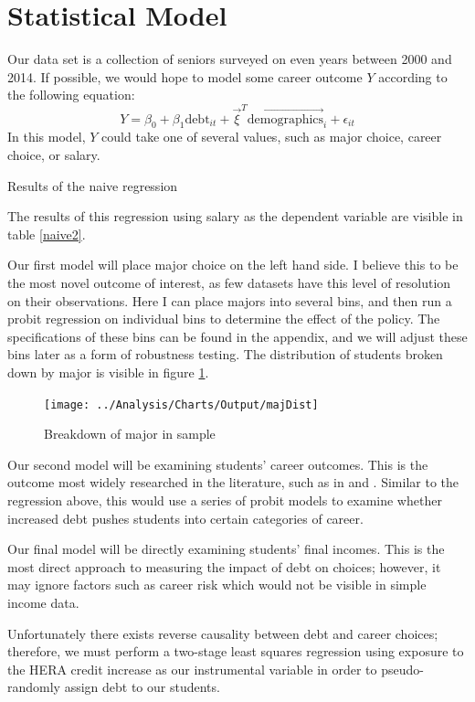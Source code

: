 \documentclass{article}
\newcommand{\regs}{../Analysis/Regressions/Output/}
\begin{document}
	\section{Statistical Model}
	
	Our data set is a collection of seniors surveyed on even years between 2000 and 2014. If possible, we would hope to model some career outcome $Y$ according to the following equation: $$Y = \beta_0 + \beta_1 \mbox{debt}_{it} + \vec{\xi}^T \vec{\mbox{demographics}}_i + \epsilon_{it}$$ In this model, $Y$ could take one of several values, such as major choice, career choice, or salary. 
	
	\begin{table}
		\centering
		\caption{Results of the naive regression}
		
		\label{naive2}
	\end{table}
	
	The results of this regression using salary as the dependent variable are visible in table \ref{naive2}. 
	
	Our first model will place major choice on the left hand side. I believe this to be the most novel outcome of interest, as few datasets have this level of resolution on their observations. Here I can place majors into several bins, and then run a probit regression on individual bins to determine the effect of the policy. The specifications of these bins can be found in the appendix, and we will adjust these bins later as a form of robustness testing. The distribution of students broken down by major is visible in figure \ref{majDist}.

	\begin{figure}
		\centering
		\caption{Breakdown of major in sample}
		\texttt{[image: ../Analysis/Charts/Output/majDist]}
		\label{majDist}
	\end{figure}
	
	Our second model will be examining students' career outcomes. This is the outcome most widely researched in the literature, such as in \textcite{rothstein2011} and \textcite{field2009}. Similar to the regression above, this would use a series of probit models to examine whether increased debt pushes students into certain categories of career.
	
	Our final model will be directly examining students' final incomes. This is the most direct approach to measuring the impact of debt on choices; however, it may ignore factors such as career risk which would not be visible in simple income data.
	
	Unfortunately there exists reverse causality between debt and career choices; therefore, we must perform a two-stage least squares regression using exposure to the HERA credit increase as our instrumental variable in order to pseudo-randomly assign debt to our students. 
	
\end{document}
